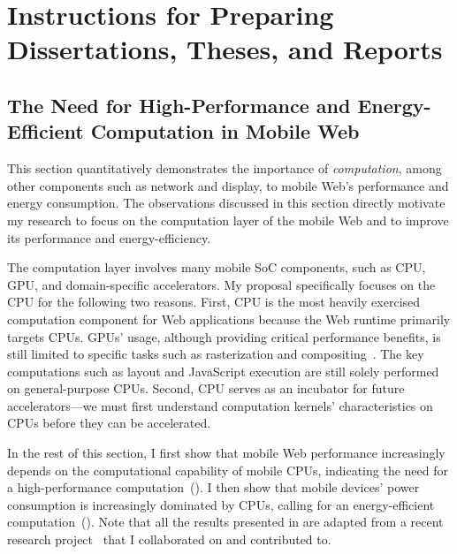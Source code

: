 \chapter{Instructions for Preparing Dissertations, Theses, and Reports}
%

\section{The Need for High-Performance and Energy-Efficient Computation in Mobile Web}
\label{sec:motivation}

This section quantitatively demonstrates the importance of \textit{computation}, among other components such as network and display, to mobile Web's performance and energy consumption. The observations discussed in this section directly motivate my research to focus on the computation layer of the mobile Web and to improve its performance and energy-efficiency.

The computation layer involves many mobile SoC components, such as CPU, GPU, and domain-specific accelerators. My proposal specifically focuses on the CPU for the following two reasons. First, CPU is the most heavily exercised computation component for Web applications because the Web runtime primarily targets CPUs. GPUs' usage, although providing critical performance benefits, is still limited to specific tasks such as rasterization and compositing~\cite{gpucompositor}. The key computations such as layout and JavaScript execution are still solely performed on general-purpose CPUs. Second, CPU serves as an incubator for future accelerators---we must first understand computation kernels' characteristics on CPUs before they can be accelerated.

In the rest of this section, I first show that mobile Web performance increasingly depends on the computational capability of mobile CPUs, indicating the need for a high-performance computation~(). I then show that mobile devices' power consumption is increasingly dominated by CPUs, calling for an energy-efficient computation~(). Note that all the results presented in  are adapted from a recent research project~\cite{mobilecpu} that I collaborated on and contributed to.

